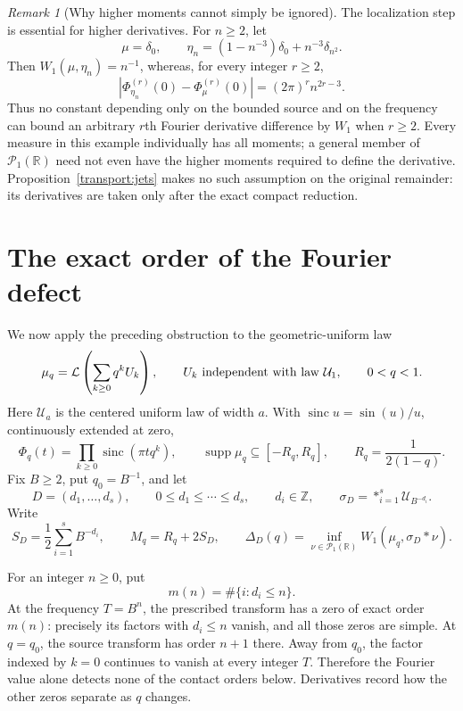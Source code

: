 \documentclass[11pt,letterpaper]{article}
\theoremstyle{definition}
\theoremstyle{remark}
\newtheorem{remark}[theorem]{Remark}
\newcommand{\R}{\mathbb R}
\newcommand{\Un}{\mathcal U}
\newcommand{\Law}{\mathcal L}
\newcommand{\Pone}{\mathcal P_1(\R)}
\newcommand{\supp}{\operatorname{supp}}
\newcommand{\sinc}{\operatorname{sinc}}
\begin{document}
\begin{remark}[Why higher moments cannot simply be ignored]
\label{transport:moment-counterexample}
The localization step is essential for higher derivatives.  For
$n\ge2$, let
\[
 \mu=\delta_0,\qquad
 \eta_n=(1-n^{-3})\delta_0+n^{-3}\delta_{n^2}.
\]
Then $W_1(\mu,\eta_n)=n^{-1}$, whereas, for every integer $r\ge2$,
\[
 |\Phi_{\eta_n}^{(r)}(0)-\Phi_\mu^{(r)}(0)|
 =(2\pi)^r n^{2r-3}.
\]
Thus no constant depending only on the bounded source and on the
frequency can bound an arbitrary $r$th Fourier derivative difference
by $W_1$ when $r\ge2$.  Every measure in this example individually has
all moments; a general member of $\Pone$ need not even have the higher
moments required to define the derivative.  Proposition~\ref{transport:jets}
makes no such assumption on the original remainder: its derivatives are
taken only after the exact compact reduction.
\end{remark}

\section{The exact order of the Fourier defect}
\label{lower:section}

We now apply the preceding obstruction to the geometric-uniform law
\[
 \mu_q=\Law\left(\sum_{k\ge0}q^kU_k\right),
 \qquad U_k\ \hbox{independent with law }\Un_1,
 \qquad 0<q<1.
\]
Here $\Un_a$ is the centered uniform law of width $a$.  With
$\sinc u=\sin(u)/u$, continuously extended at zero,
\begin{equation}\label{lower:source-transform}
 \Phi_q(t)=\prod_{k\ge0}\sinc(\pi tq^k),\qquad
 \supp\mu_q\subseteq[-R_q,R_q],\qquad
 R_q=\frac1{2(1-q)}.
\end{equation}
Fix $B\ge2$, put $q_0=B^{-1}$, and let
\[
 D=(d_1,\ldots,d_s),\qquad
 0\le d_1\le\cdots\le d_s,\qquad d_i\in\mathbb Z,
 \qquad
 \sigma_D=\mathop{*}_{i=1}^s\Un_{B^{-d_i}}.
\]
Write
\begin{equation}\label{lower:factor-radius}
 S_D=\frac12\sum_{i=1}^sB^{-d_i},\qquad
 M_q=R_q+2S_D,
 \qquad
 \Delta_D(q)=\inf_{\nu\in\Pone}W_1(\mu_q,\sigma_D*\nu).
\end{equation}

For an integer $n\ge0$, put
\begin{equation}\label{lower:multiplicity}
 m(n)=\#\{i:d_i\le n\}.
\end{equation}
At the frequency $T=B^n$, the prescribed transform has a zero of
exact order $m(n)$: precisely its factors with $d_i\le n$ vanish,
and all those zeros are simple.  At $q=q_0$, the source transform has
order $n+1$ there.  Away from $q_0$, the factor indexed by $k=0$
continues to vanish at every integer $T$.  Therefore the Fourier value
alone detects none of the contact orders below.  Derivatives record how
the other zeros separate as $q$ changes.
\end{document}
